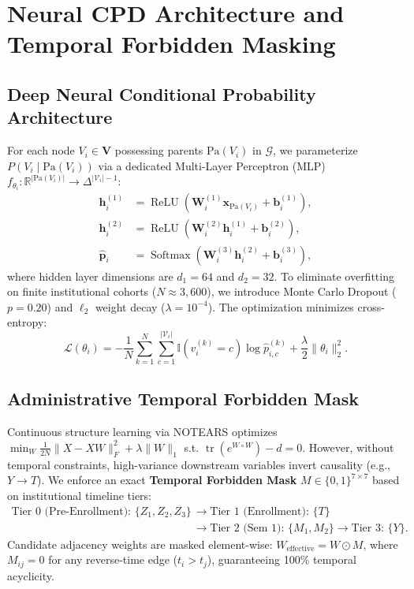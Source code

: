 \section{Neural CPD Architecture and Temporal Forbidden Masking}
\label{sec:meth_neural_cpd}

\subsection{Deep Neural Conditional Probability Architecture}

For each node $V_i \in \mathbf{V}$ possessing parents $\text{Pa}(V_i)$ in $\mathcal{G}$, we parameterize $P(V_i \mid \text{Pa}(V_i))$ via a dedicated Multi-Layer Perceptron (MLP) $f_{\theta_i}: \mathbb{R}^{|\text{Pa}(V_i)|} \to \Delta^{|\mathcal{V}_i|-1}$:
\begin{align}
    \mathbf{h}^{(1)}_i &= \operatorname{ReLU}\left( \mathbf{W}^{(1)}_i \mathbf{x}_{\text{Pa}(V_i)} + \mathbf{b}^{(1)}_i \right), \label{eq:mlp_layer1} \\
    \mathbf{h}^{(2)}_i &= \operatorname{ReLU}\left( \mathbf{W}^{(2)}_i \mathbf{h}^{(1)}_i + \mathbf{b}^{(2)}_i \right), \label{eq:mlp_layer2} \\
    \hat{\mathbf{p}}_i &= \operatorname{Softmax}\left( \mathbf{W}^{(3)}_i \mathbf{h}^{(2)}_i + \mathbf{b}^{(3)}_i \right), \label{eq:mlp_output}
\end{align}
where hidden layer dimensions are $d_1 = 64$ and $d_2 = 32$. To eliminate overfitting on finite institutional cohorts ($N \approx 3,600$), we introduce Monte Carlo Dropout ($p = 0.20$) and $\ell_2$ weight decay ($\lambda = 10^{-4}$). The optimization minimizes cross-entropy:
\begin{equation}
    \mathcal{L}(\theta_i) = -\frac{1}{N} \sum_{k=1}^N \sum_{c=1}^{|\mathcal{V}_i|} \mathbb{I}(v_{i}^{(k)} = c) \log \hat{p}_{i, c}^{(k)} + \frac{\lambda}{2} \|\theta_i\|_2^2.
    \label{eq:neural_cpd_loss}
\end{equation}

\subsection{Administrative Temporal Forbidden Mask}

Continuous structure learning via NOTEARS optimizes $\min_W \frac{1}{2N}\|X - XW\|_F^2 + \lambda \|W\|_1$ s.t. $\operatorname{tr}(e^{W \circ W}) - d = 0$. However, without temporal constraints, high-variance downstream variables invert causality (e.g., $Y \to T$). We enforce an exact \textbf{Temporal Forbidden Mask} $M \in \{0, 1\}^{7 \times 7}$ based on institutional timeline tiers:
\begin{align}
    \text{Tier 0 (Pre-Enrollment): } \{Z_1, Z_2, Z_3\} &\longrightarrow \text{Tier 1 (Enrollment): } \{T\} \nonumber \\
    &\longrightarrow \text{Tier 2 (Sem 1): } \{M_1, M_2\} \longrightarrow \text{Tier 3: } \{Y\}.
    \label{eq:temporal_tiers}
\end{align}
Candidate adjacency weights are masked element-wise: $W_{\text{effective}} = W \odot M$, where $M_{ij} = 0$ for any reverse-time edge ($t_i > t_j$), guaranteeing 100\% temporal acyclicity.
